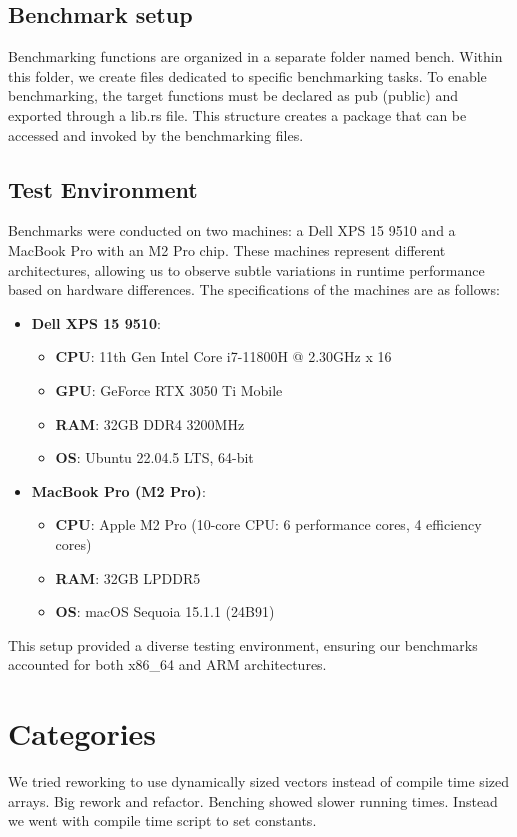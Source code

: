 \documentclass[twoside,11pt]{report}
\theoremstyle{definition}
\theoremstyle{plain}
\begin{document}
\subsection{Benchmark setup}
Benchmarking functions are organized in a separate folder named bench. Within this folder, we create files dedicated to specific benchmarking tasks. To enable benchmarking, the target functions must be declared as pub (public) and exported through a lib.rs file. This structure creates a package that can be accessed and invoked by the benchmarking files.

\subsection{Test Environment}
Benchmarks were conducted on two machines: a Dell XPS 15 9510 and a MacBook Pro with an M2 Pro chip. These machines represent different architectures, allowing us to observe subtle variations in runtime performance based on hardware differences. The specifications of the machines are as follows:

\begin{itemize}
  \item \textbf{Dell XPS 15 9510}:
    \begin{itemize}
      \item \textbf{CPU}: 11th Gen Intel Core i7-11800H @ 2.30GHz x 16 
      \item \textbf{GPU}: GeForce RTX 3050 Ti Mobile
      \item \textbf{RAM}: 32GB DDR4 3200MHz
      \item \textbf{OS}: Ubuntu 22.04.5 LTS, 64-bit
    \end{itemize}
  \item \textbf{MacBook Pro (M2 Pro)}:
    \begin{itemize}
      \item \textbf{CPU}: Apple M2 Pro (10-core CPU: 6 performance cores, 4 efficiency cores)
      \item \textbf{RAM}: 32GB LPDDR5
      \item \textbf{OS}: macOS Sequoia 15.1.1 (24B91)
    \end{itemize}
\end{itemize}
This setup provided a diverse testing environment, ensuring our benchmarks accounted for both x86\_64 and ARM architectures.

\section{Categories}\label{sub:categories} %
We tried reworking to use dynamically sized vectors instead of compile time sized arrays. Big rework and refactor. Benching showed slower running times. Instead we went with compile time script to set constants.
\end{document}
